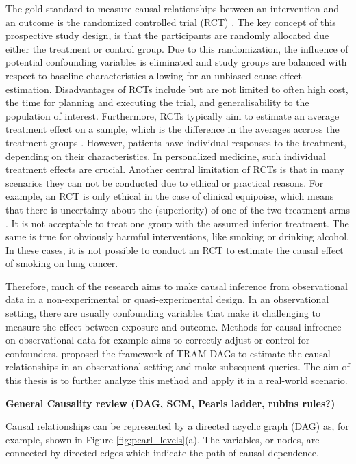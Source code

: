 The gold standard to measure causal relationships between an intervention and an outcome is the randomized controlled trial (RCT) \citep{hariton2018}. The key concept of this prospective study design, is that the participants are randomly allocated due either the treatment or control group. Due to this randomization, the influence of potential confounding variables is eliminated and study groups are balanced with respect to baseline characteristics allowing for an unbiased cause-effect estimation.
Disadvantages of RCTs include but are not limited to often high cost, the time for planning and executing the trial, and generalisability to the population of interest. %
Furthermore, RCTs typically aim to estimate an average treatment effect on a sample, which is the difference in the averages accross the treatment groups \citep{nichols2007}. However, patients have individual responses to the treatment, depending on their characteristics. In personalized medicine, such individual treatment effects are crucial.
Another central limitation of RCTs is that in many scenarios they can not be conducted due to ethical or practical reasons. For example, an RCT is only ethical in the case of clinical equipoise, which means that there is uncertainty about the (superiority) of one of the two treatment arms \citep{freedman1987}. It is not acceptable to treat one group with the assumed inferior treatment. The same is true for obviously harmful interventions, like smoking or drinking alcohol. In these cases, it is not possible to conduct an RCT to estimate the causal effect of smoking on lung cancer.

Therefore, much of the research aims to make causal inference from observational data in a non-experimental or quasi-experimental design. In an observational setting, there are usually confounding variables that make it challenging to measure the effect between exposure and outcome. Methods for causal infreence on observational data for example aims to correctly adjust or control for confounders. \citet{sick2025} proposed the framework of TRAM-DAGs to estimate the causal relationships in an observational setting and make subsequent queries. The aim of this thesis is to further analyze this method and apply it in a real-world scenario.


\textbf{General Causality review (DAG, SCM, Pearls ladder, rubins rules?)}

Causal relationships can be represented by a directed acyclic graph (DAG) as, for example, shown in Figure \ref{fig:pearl_levels}(a). The variables, or nodes, are connected by directed edges which indicate the path of causal dependence.

